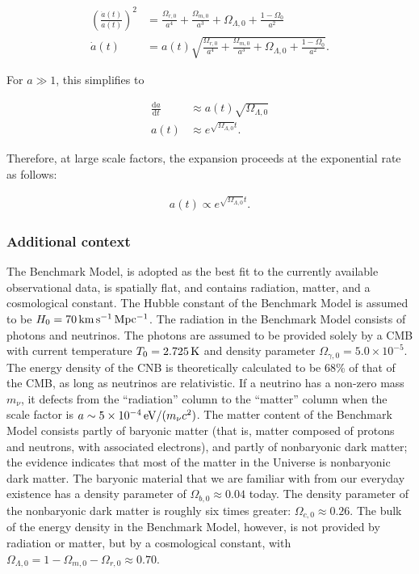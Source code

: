 \documentclass[a4paper,11pt]{article}
\begin{document}
\begin{align*}
    \left(\frac{\dot{a}(t)}{a(t)}\right)^2 &= \frac{\Omega_{r,0}}{a^4} + \frac{\Omega_{m,0}}{a^3} + \Omega_{\Lambda,0} + \frac{1-\Omega_0}{a^2} \\
    \dot{a}(t) &= a(t)\sqrt{\frac{\Omega_{r,0}}{a^4} + \frac{\Omega_{m,0}}{a^3} + \Omega_{\Lambda,0} + \frac{1-\Omega_0}{a^2}}.
\end{align*}

{\noindent}For $a\gg1$, this simplifies to

\begin{align*}
    \frac{\mathrm{d}a}{\mathrm{d}t} &\approx a(t)\sqrt{\Omega_{\Lambda,0}} \\
    a(t) &\approx e^{\sqrt{\Omega_{\Lambda,0}}t}.
\end{align*}

{\noindent}Therefore, at large scale factors, the expansion proceeds at the exponential rate as follows:

\begin{align*}
    a(t) \propto e^{\sqrt{\Omega_{\Lambda,0}}t}.
\end{align*}

\subsubsection{Additional context}

{\noindent}The Benchmark Model, is adopted as the best fit to the currently available observational data, is spatially flat, and contains radiation, matter, and a cosmological constant. The Hubble constant of the Benchmark Model is assumed to be $H_0=70\,{\rm km\,s^{-1}\,Mpc^{-1}}$. The radiation in the Benchmark Model consists of photons and neutrinos. The photons are assumed to be provided solely by a CMB with current temperature $T_0=2.725\,{\rm K}$ and density parameter $\Omega_{\gamma,0}=5.0\times10^{-5}$. The energy density of the CNB is theoretically calculated to be 68\% of that of the CMB, as long as neutrinos are relativistic. If a neutrino has a non-zero mass $m_\nu$, it defects from the ``radiation'' column to the ``matter'' column when the scale factor is $a\sim5\times10^{-4}\,{\rm eV}/(m_\nu c^2)$. The matter content of the Benchmark Model consists partly of baryonic matter (that is, matter composed of protons and neutrons, with associated electrons), and partly of nonbaryonic dark matter; the evidence indicates that most of the matter in the Universe is nonbaryonic dark matter. The baryonic material that we are familiar with from our everyday existence has a density parameter of $\Omega_{b,0}\approx0.04$ today. The density parameter of the nonbaryonic dark matter is roughly six times greater: $\Omega_{c,0}\approx0.26$. The bulk of the energy density in the Benchmark Model, however, is not provided by radiation or matter, but by a cosmological constant, with $\Omega_{\Lambda,0}=1-\Omega_{m,0}-\Omega_{r,0}\approx0.70$.
\end{document}
